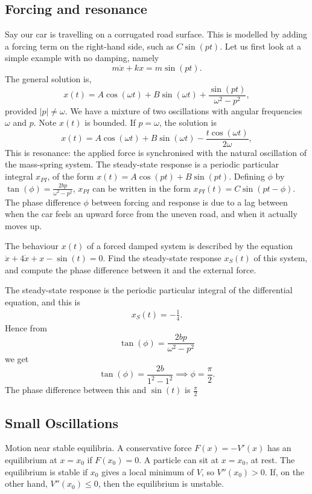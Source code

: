 \documentclass[10pt, a4paper]{article}
\begin{document}
\subsection{Forcing and resonance}
Say our car is travelling on a corrugated road surface.
This is modelled by adding a forcing term on the right-hand side,
such as $C\sin(pt)$.
Let us first look at a simple example with no damping,
namely
\[
m\ddot{x} + kx = m\sin(pt).
\]
The general solution is,
\[
x(t) = A\cos(\omega t) + B\sin(\omega t) + \frac{\sin(pt)}{\omega ^ 2 - p ^ 2},
\]
provided $|p| \neq \omega$.
We have a mixture of two oscillations with angular frequencies $\omega$ and $p$.
Note $x(t)$ is bounded.
If $p = \omega$,
the solution is
\[
x(t) = A\cos(\omega t) + B\sin(\omega t) - \frac{t\cos(\omega t)}{2\omega},
\]
This is resonance:
the applied force is synchronised with the natural oscillation of the mass-spring system.
The steady-state response is a periodic particular integral $x_{PI}$,
of the form $x(t) = A\cos(pt) + B\sin(pt)$.
Defining $\phi$ by $\tan(\phi) = \frac{2bp}{\omega ^ 2 - p ^ 2}$,
$x_{PI}$ can be written in the form $x_{PI}(t) = C\sin(pt - \phi)$.
The phase difference $\phi$ between forcing and response is due to a lag between when the car feels an upward force from the uneven road,
and when it actually moves up.
\begin{example}
    The behaviour $x(t)$ of a forced damped system is described by the equation $\ddot{x} + 4\dot{x} + x - \sin(t) = 0$.
    Find the steady-state response $x_S(t)$ of this system,
    and compute the phase difference between it and the external force.
    \begin{solution}
        The steady-state response is the periodic particular integral of the differential equation,
        and this is
        \begin{align*}
            x_S(t) = -\frac{1}{4}.
        \end{align*}
        Hence from
        \[
        \tan(\phi) = \frac{2bp}{\omega ^ 2 - p ^ 2}
        \]
        we get
        \[
        \tan(\phi) = \frac{2b}{1 ^ 2 - 1 ^ 2} \implies \phi = \frac{\pi}{2}.
        \]
        The phase difference between this and $\sin(t)$ is $\frac{\pi}{2}$
    \end{solution}
\end{example}

\subsection{Small Oscillations}
Motion near stable equilibria.
A conservative force $F(x) = -V'(x)$ has an equilibrium at $x = x_0$ if $F(x_0) = 0$.
A particle can sit at $x = x_0$,
at rest.
The equilibrium is stable if $x_0$ gives a local minimum of $V$,
so $V''(x_0) > 0$.
If,
on the other hand,
$V''(x_0) \leq 0$,
then the equilibrium is unstable.
\end{document}
